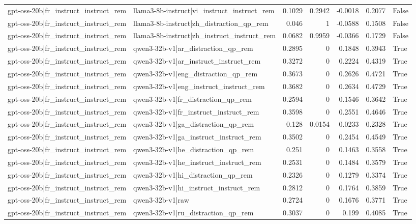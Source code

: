 \begin{table}
\begin{tabular}{l l r r r r l}
gpt-oss-20b|fr_instruct_instruct_rem & llama3-8b-instruct|vi_instruct_instruct_rem & 0.1029 & 0.2942 & -0.0018 & 0.2077 & False \\
gpt-oss-20b|fr_instruct_instruct_rem & llama3-8b-instruct|zh_distraction_qp_rem & 0.046 & 1 & -0.0588 & 0.1508 & False \\
gpt-oss-20b|fr_instruct_instruct_rem & llama3-8b-instruct|zh_instruct_instruct_rem & 0.0682 & 0.9959 & -0.0366 & 0.1729 & False \\
gpt-oss-20b|fr_instruct_instruct_rem & qwen3-32b-v1|ar_distraction_qp_rem & 0.2895 & 0 & 0.1848 & 0.3943 & True \\
gpt-oss-20b|fr_instruct_instruct_rem & qwen3-32b-v1|ar_instruct_instruct_rem & 0.3272 & 0 & 0.2224 & 0.4319 & True \\
gpt-oss-20b|fr_instruct_instruct_rem & qwen3-32b-v1|eng_distraction_qp_rem & 0.3673 & 0 & 0.2626 & 0.4721 & True \\
gpt-oss-20b|fr_instruct_instruct_rem & qwen3-32b-v1|eng_instruct_instruct_rem & 0.3682 & 0 & 0.2634 & 0.4729 & True \\
gpt-oss-20b|fr_instruct_instruct_rem & qwen3-32b-v1|fr_distraction_qp_rem & 0.2594 & 0 & 0.1546 & 0.3642 & True \\
gpt-oss-20b|fr_instruct_instruct_rem & qwen3-32b-v1|fr_instruct_instruct_rem & 0.3598 & 0 & 0.2551 & 0.4646 & True \\
gpt-oss-20b|fr_instruct_instruct_rem & qwen3-32b-v1|ga_distraction_qp_rem & 0.128 & 0.0154 & 0.0233 & 0.2328 & True \\
gpt-oss-20b|fr_instruct_instruct_rem & qwen3-32b-v1|ga_instruct_instruct_rem & 0.3502 & 0 & 0.2454 & 0.4549 & True \\
gpt-oss-20b|fr_instruct_instruct_rem & qwen3-32b-v1|he_distraction_qp_rem & 0.251 & 0 & 0.1463 & 0.3558 & True \\
gpt-oss-20b|fr_instruct_instruct_rem & qwen3-32b-v1|he_instruct_instruct_rem & 0.2531 & 0 & 0.1484 & 0.3579 & True \\
gpt-oss-20b|fr_instruct_instruct_rem & qwen3-32b-v1|hi_distraction_qp_rem & 0.2326 & 0 & 0.1279 & 0.3374 & True \\
gpt-oss-20b|fr_instruct_instruct_rem & qwen3-32b-v1|hi_instruct_instruct_rem & 0.2812 & 0 & 0.1764 & 0.3859 & True \\
gpt-oss-20b|fr_instruct_instruct_rem & qwen3-32b-v1|raw & 0.2724 & 0 & 0.1676 & 0.3771 & True \\
gpt-oss-20b|fr_instruct_instruct_rem & qwen3-32b-v1|ru_distraction_qp_rem & 0.3037 & 0 & 0.199 & 0.4085 & True \\

\end{tabular}
\end{table}
